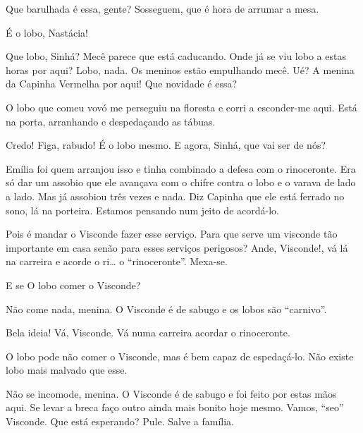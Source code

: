  Que barulhada é essa, gente? Sosseguem, que é hora de
arrumar a mesa.

 É o lobo, Nastácia!

 Que lobo, Sinhá? Mecê parece que está caducando. Onde
já se viu lobo a estas horas por aqui? Lobo, nada. Os meninos estão
empulhando mecê.  Ué? A menina da
Capinha Vermelha por aqui! Que novidade é essa?

 O lobo que comeu vovó me perseguiu na floresta e corri a
esconder-me aqui. Está na porta, arranhando e despedaçando as tábuas.


 Credo! Figa, rabudo! É o lobo mesmo. E agora, Sinhá,
que vai ser de nós?

 Emília foi quem arranjou isso e tinha combinado a defesa
com o rinoceronte. Era só dar um assobio que ele avançava com o chifre
contra o lobo e o varava de lado a lado. Mas já assobiou três vezes e
nada. Diz Capinha que ele está ferrado no sono, lá na porteira. Estamos
pensando num jeito de acordá-lo.

 Pois é mandar o Visconde fazer esse serviço. Para que
serve um visconde tão importante em casa senão para esses serviços
perigosos?  Ande, Visconde!, vá lá
na carreira e acorde o ri\ldots{} o ``rinoceronte''. Mexa-se.

 E se O lobo comer o Visconde?

 Não come nada, menina. O Visconde é de sabugo e os
lobos são ``carnivo''.

 Bela ideia! Vá, Visconde. Vá numa carreira acordar o
rinoceronte.

  O lobo pode não comer o
Visconde, mas é bem capaz de espedaçá-lo. Não existe lobo mais malvado
que esse.

 Não se incomode, menina. O Visconde é de sabugo e foi
feito por estas mãos aqui. Se levar a breca faço outro ainda mais bonito
hoje mesmo. Vamos, ``seo'' Visconde. Que está esperando? Pule. Salve a
família.


